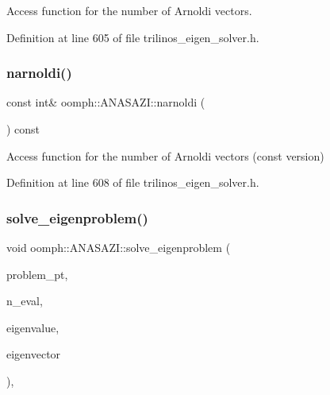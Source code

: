 Access function for the number of Arnoldi vectors. 



Definition at line 605 of file trilinos\+\_\+eigen\+\_\+solver.\+h.

\mbox{\label{classoomph_1_1ANASAZI_a5f0489a5b0cd830ba93e1ae33cc14c24}} 
\subsubsection{\texorpdfstring{narnoldi()}{narnoldi()}\hspace{0.1cm}{\footnotesize\ttfamily [2/2]}}
{\footnotesize\ttfamily const int\& oomph\+::\+A\+N\+A\+S\+A\+Z\+I\+::narnoldi (\begin{DoxyParamCaption}{ }\end{DoxyParamCaption}) const\hspace{0.3cm}{\ttfamily [inline]}}



Access function for the number of Arnoldi vectors (const version) 



Definition at line 608 of file trilinos\+\_\+eigen\+\_\+solver.\+h.

\mbox{\label{classoomph_1_1ANASAZI_a5b13a2a77a422033c6a522ec68549fa5}} 
\subsubsection{\texorpdfstring{solve\+\_\+eigenproblem()}{solve\_eigenproblem()}}
{\footnotesize\ttfamily void oomph\+::\+A\+N\+A\+S\+A\+Z\+I\+::solve\+\_\+eigenproblem (\begin{DoxyParamCaption}\item[{\hyperlink{classoomph_1_1Problem}{Problem} $\ast$const \&}]{problem\+\_\+pt,  }\item[{const int \&}]{n\+\_\+eval,  }\item[{\hyperlink{classoomph_1_1Vector}{Vector}$<$ std\+::complex$<$ double $>$ $>$ \&}]{eigenvalue,  }\item[{\hyperlink{classoomph_1_1Vector}{Vector}$<$ \hyperlink{classoomph_1_1DoubleVector}{Double\+Vector} $>$ \&}]{eigenvector }\end{DoxyParamCaption})\hspace{0.3cm}{\ttfamily [inline]}, {\ttfamily [virtual]}}



